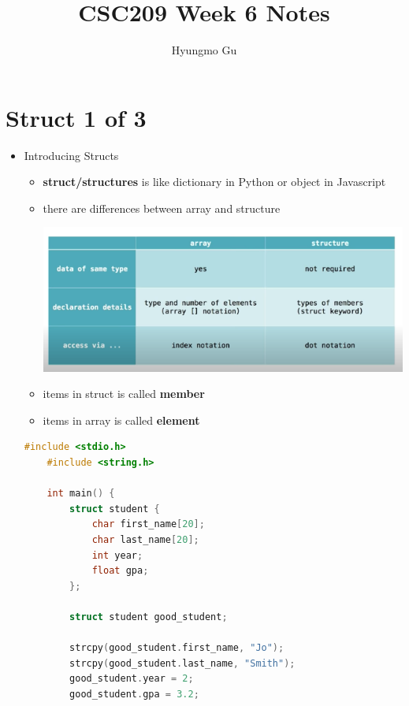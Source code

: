\documentclass[12pt]{article}
\begin{document}
\title{CSC209 Week 6 Notes}
\author{Hyungmo Gu}
\maketitle

\section*{Struct 1 of 3}

\bigskip

\begin{itemize}
    \item Introducing Structs
    \begin{itemize}
        \item \textbf{struct/structures} is like dictionary in Python or object in Javascript
        \item there are differences between array and structure

        \begin{center}
        \includegraphics[width=\linewidth]{images/week_6_structs_1_1.png}
        \end{center}

        \item items in struct is called \textbf{member}
        \item items in array is called \textbf{element}
    \end{itemize}

    \bigskip

    \begin{lstlisting}[language=c,caption={struct\_example\_1.c}]
    #include <stdio.h>
    #include <string.h>

    int main() {
        struct student {
            char first_name[20];
            char last_name[20];
            int year;
            float gpa;
        };

        struct student good_student;

        strcpy(good_student.first_name, "Jo");
        strcpy(good_student.last_name, "Smith");
        good_student.year = 2;
        good_student.gpa = 3.2;


\end{lstlisting}
\end{itemize}
\end{document}
